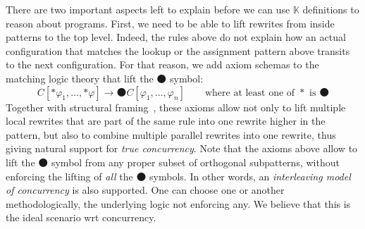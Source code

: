 \documentclass[UTF8,11pt]{article}
\theoremstyle{plain}
\theoremstyle{definition}
\theoremstyle{remark}
\newcommand{\K}{\mbox{$\mathbb{K}$}\xspace}
\newcommand{\snext}{{\medbullet}}
\begin{document}
There are two important aspects left to explain before we can use \K definitions to
reason about programs.
First, we need to be able to lift rewrites from inside patterns to the
top level.
Indeed, the rules above do not explain how an actual configuration
that matches the lookup or the assignment pattern above transits to
the next configuration.
For that reason, we add axiom schemas to the matching logic theory
that lift the $\snext$ symbol:
$$
C[* \varphi_1,\dots, * \varphi] \to \snext C[\varphi_1,\dots,\varphi_n]
\qquad
\text{where at least one of $*$ is $\snext$}
$$
Together with structural framing~\cite{rosu-2017-lmcs},
these axioms allow not only to lift multiple local rewrites
that are part of the same rule into one rewrite higher in the
pattern, but also to combine multiple parallel rewrites into
one rewrite, thus giving natural support for \emph{true concurrency}.
Note that the axioms above allow to lift the $\snext$ symbol from
any proper subset of orthogonal subpatterns, without enforcing
the lifting of \emph{all} the $\snext$ symbols.
In other words, an \emph{interleaving model of concurrency}
is also supported.
One can choose one or another methodologically, the underlying
logic not enforcing any.
We believe that this is the ideal scenario wrt concurrency.
\end{document}
